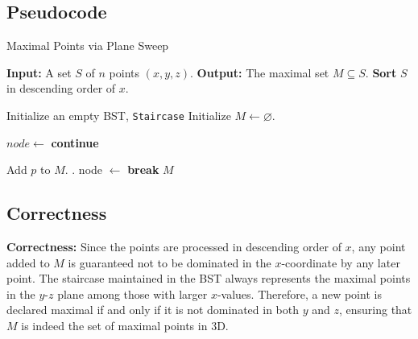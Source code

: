 \documentclass[a4paper]{article}
\begin{document}
\subsection*{Pseudocode}
\begin{algorithm}
\caption{Maximal Points via Plane Sweep}
\begin{algorithmic}[1]
    \State \textbf{Input:} A set $S$ of $n$ points $(x,y,z)$.
    \State \textbf{Output:} The maximal set $M \subseteq S$.
    \State \textbf{Sort} $S$ in descending order of $x$.

    \vspace{0.5em}
    \State Initialize an empty BST, \texttt{Staircase}
    \State Initialize $M \gets \varnothing$.
    
    \vspace{0.5em}
            \State $node \gets$ 
            \State \textbf{continue}
            \EndIf
        \EndIf

        \vspace{0.5em}
        \State Add $p$ to $M$. 
        \State {}.
            \State node $\gets$ 
                \State \textbf{break}
            \EndIf
            \State {}
        \EndWhile
    \EndFor
    \State \Return $M$
\EndFunction
\end{algorithmic}
\end{algorithm}

\subsection*{Correctness}
\textbf{Correctness:} Since the points are processed in descending order of $x$, any point added to $M$ is guaranteed not to be dominated in the $x$-coordinate by any later point. The staircase maintained in the BST always represents the maximal points in the $y$-$z$ plane among those with larger $x$-values. Therefore, a new point is declared maximal if and only if it is not dominated in both $y$ and $z$, ensuring that $M$ is indeed the set of maximal points in 3D.
\end{document}
